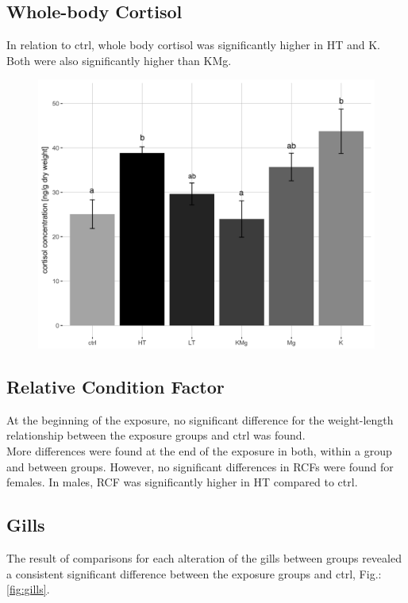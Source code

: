 \documentclass[twoside]{article}
\begin{document}
\begin{multicols}{2}
\subsection{Whole-body Cortisol}
In relation to ctrl, whole body cortisol was significantly higher in HT and K. Both were also significantly higher than KMg. 



\begin{figure}[H]
 \centering
 \includegraphics[scale=.1]{cortisol2205.png}
 \label{fig:cort}
\end{figure}
\FloatBarrier

\subsection{Relative Condition Factor}
At the beginning of the exposure, no significant difference for the weight-length relationship between the exposure groups and ctrl was found. \\ %
More differences were found at the end of the exposure in both, within a group and between groups. However, no significant differences in RCFs were found for females. In males, RCF was significantly higher in HT compared to ctrl. 


\subsection{Gills}
The result of comparisons for each alteration of the gills between groups revealed a consistent significant difference between the exposure groups and ctrl, Fig.:\ref{fig:gills}. \\


\end{multicols}
\end{document}
